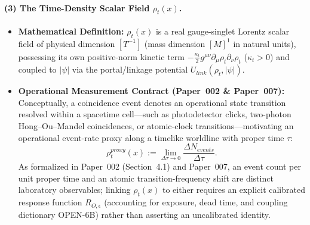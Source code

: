 \documentclass[american,11pt,letterpaper]{article}
\def\mathcal#1{#1}%
\def\mathrm#1{#1}%
\def\texttt#1{#1}%
\def\emph#1{#1}%
\begin{document}
\paragraph{(3) The Time-Density Scalar Field $\rho_t(x)$.}
\begin{itemize}
  \item \textbf{Mathematical Definition:} $\rho_t(x)$ is a real gauge-singlet Lorentz scalar field of physical dimension $[T^{-1}]$ (mass dimension $[M]^1$ in natural units), possessing its own positive-norm kinetic term $-\frac{\kappa_t}{2}g^{\mu\nu}\partial_\mu\rho_t\partial_\nu\rho_t$ ($\kappa_t > 0$) and coupled to $|\psi|$ via the portal/linkage potential $U_{\mathrm{link}}(\rho_t, |\psi|)$.
  \item \textbf{Operational Measurement Contract (Paper~002 \& Paper~007):} Conceptually, a \emph{coincidence event} denotes an operational state transition resolved within a spacetime cell---such as photodetector clicks, two-photon Hong--Ou--Mandel coincidences, or atomic-clock transitions---motivating an operational event-rate proxy along a timelike worldline with proper time $\tau$:
  \begin{equation}
  \rho_t^{\mathrm{proxy}}(x) := \lim_{\Delta\tau \to 0} \frac{\Delta N_{\mathrm{events}}}{\Delta\tau}.
  \label{eq:def_rhot_operational}
  \end{equation}
  As formalized in Paper~002 (Section~4.1) and Paper~007, an event count per unit proper time and an atomic transition-frequency shift are distinct laboratory observables; linking $\rho_t(x)$ to either requires an explicit calibrated response function $R_{\mathcal{O},\epsilon}$ (accounting for exposure, dead time, and coupling dictionary \texttt{OPEN-6B}) rather than asserting an uncalibrated identity.
\end{itemize}
\end{document}
